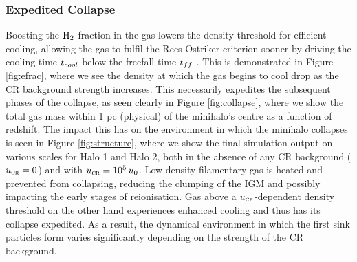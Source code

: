\documentclass[../thesis.tex]{subfiles}
\begin{document}
\subsubsection{Expedited Collapse}
\label{sec:expedited_collapse}
Boosting the $\mathrm{H}_2$ fraction in the gas lowers the density threshold for efficient cooling, allowing the gas to fulfil the Rees-Ostriker criterion sooner by driving the cooling time $t_{\mathrm \small cool}$ below the freefall time $t_{\mathrm \small ff}$ \citep{ReesOstriker1977}.
This is demonstrated in Figure \ref{fig:efrac}, where we see the density at which the gas begins to cool drop as the CR background strength increases.  
This necessarily expedites the subsequent phases of the collapse, as seen clearly in Figure \ref{fig:collapse}, where we show the total gas mass within 1 pc (physical) of the minihalo's centre as a function of redshift.  
The impact this has on the environment in which the minihalo collapses is seen in Figure \ref{fig:structure}, where we show the final simulation output on various scales for Halo 1 and Halo 2, both in the absence of any CR background (${u}_{\textsc{cr}}=0$) and with ${u}_{\textsc{cr}}=10^5\,u_0$. 
Low density filamentary gas is heated and prevented from collapsing, reducing the clumping of the IGM and possibly impacting the early stages of reionisation.
Gas above a ${u}_{\textsc{cr}}$-dependent density threshold on the other hand experiences enhanced cooling and thus has its collapse expedited.
As a result, the dynamical environment in which the first sink particles form varies significantly depending on the strength of the CR background.
\end{document}
